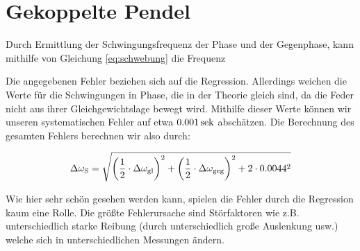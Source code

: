 \section{Gekoppelte Pendel}
Durch Ermittlung der Schwingungsfrequenz der Phase und der Gegenphase, kann mithilfe von Gleichung \ref{eq:schwebung} die Frequenz



\begin{table}
\caption{Aufgetragen ist der Abstand der Feder zum Aufhängepunkt in $\mathrm{[mm]}$ und die halbe Schwingungsdauer der Gleich-/Gegenschwingungen bzw. der daraus berechneten und experimentell bestimmten Schwingungsdauern $\omega_\n{S}$.}
\label{tb:values}
\end{table}

Die angegebenen Fehler beziehen sich auf die Regression. Allerdings weichen die Werte für die Schwingungen in Phase, die in der Theorie gleich sind, da die Feder nicht aus ihrer Gleichgewichtslage bewegt wird. Mithilfe dieser Werte können wir unseren systematischen Fehler auf etwa $\unit[0.001]{sek}$ abschätzen. Die Berechnung des gesamten Fehlers berechnen wir also durch:

\begin{equation*}
\Delta \omega_{\mathrm{S}} = \sqrt{
\left(\frac{1}{2} \cdot \Delta\omega_{\mathrm{gl}}\right)^2
+ 
\left(\frac{1}{2} \cdot \Delta\omega_{\mathrm{geg}}\right)^2
+
2 \cdot 0.0044^2
}
\end{equation*}

Wie hier sehr schön gesehen werden kann, spielen die Fehler durch die Regression kaum eine Rolle. Die größte Fehlerursache sind Störfaktoren wie z.B. unterschiedlich starke Reibung (durch unterschiedlich große Auslenkung usw.) welche sich in unterschiedlichen Messungen ändern.




